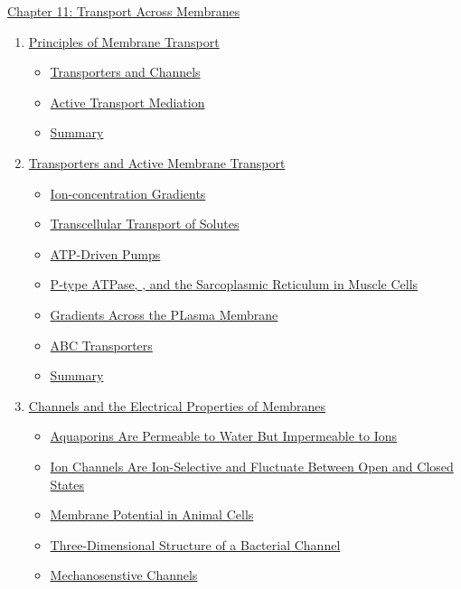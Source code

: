 \documentclass[12pt,letterpaper]{article}
\begin{document}
\begin{chapbox}{\hyperlink{home}{Chapter 11: Transport Across Membranes}}
    \begin{enumerate}
        \item \hyperlink{11.1}{Principles of Membrane Transport}
            \begin{itemize}
                \item \hyperlink{11.1.1}{Transporters and Channels}
                \item \hyperlink{11.1.2}{Active Transport Mediation}
                \item \hyperlink{11.1.r}{Summary}
            \end{itemize}
        \item \hyperlink{11.2}{Transporters and Active Membrane Transport}
            \begin{itemize}
                \item \hyperlink{11.2.1}{Ion-concentration Gradients}
                \item \hyperlink{11.2.2}{Transcellular Transport of Solutes}
                \item \hyperlink{11.2.3}{ATP-Driven Pumps}
                \item \hyperlink{11.2.4}{P-type ATPase, , and the Sarcoplasmic Reticulum in Muscle Cells}
                \item \hyperlink{11.2.5}{Gradients Across the PLasma Membrane}
                \item \hyperlink{11.2.6}{ABC Transporters}
                \item \hyperlink{11.2.r}{Summary}
            \end{itemize}
        \item \hyperlink{11.3}{Channels and the Electrical Properties of Membranes}
            \begin{itemize}
                \item \hyperlink{11.3.1}{Aquaporins Are Permeable to Water But Impermeable to Ions}
                \item \hyperlink{11.3.2}{Ion Channels Are Ion-Selective and Fluctuate Between Open and Closed States}
                \item \hyperlink{11.3.3}{Membrane Potential in Animal Cells}
                \item \hyperlink{11.3.4}{Three-Dimensional Structure of a Bacterial  Channel}
                \item \hyperlink{11.3.5}{Mechanosenstive Channels}

\end{itemize}
\end{enumerate}
\end{chapbox}
\end{document}
